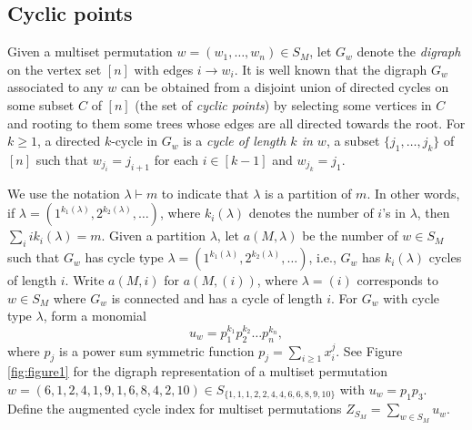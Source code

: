 \documentclass[letterpaper]{amsart}
\theoremstyle{plain}
\theoremstyle{definition}
\theoremstyle{remark}
\begin{document}
\subsection{Cyclic points}
Given a multiset permutation $w= (w_1, \dots, w_n) \in S_M$, let $G_w$ denote the {\em digraph} on the vertex set $[n]$ with edges $i \rightarrow w_i$. It is well known that the digraph $G_w$ associated to any $w$ can be obtained from a disjoint union of directed cycles on some subset $C$ of $[n]$ (the set of {\em cyclic points}) by selecting some vertices in $C$ and rooting to them some trees whose edges are all directed towards the root. 
For $k\geq 1$, a directed $k$-cycle in $G_w$ is a {\em cycle of length $k$ in $w$}, a subset $\{j_1, \ldots, j_k\}$ of $[n]$ such that $w_{j_i} = j_{i + 1}$ for each $i \in [k - 1]$ and $w_{j_k} = j_1$.

We use the notation $\lambda \vdash m$ to indicate that $\lambda$ is a partition of $m$. In other words, if $\lambda=(1^{k_1(\lambda)}, 2^{k_2(\lambda)}, \dots)$, where $k_i(\lambda)$ denotes the number of $i$'s in $\lambda$, then $\sum_i ik_i(\lambda) = m$. Given a partition $\lambda$, let $a(M,\lambda)$ be the number of $w\in S_M$ such that $G_w$ has cycle type 
$\lambda=(1^{k_1(\lambda)}, 2^{k_2(\lambda)}, \dots)$, i.e., $G_w$ has $k_i(\lambda)$ cycles of length $i$. Write $a(M,i)$ for $a(M,(i))$, where $\lambda=(i)$ corresponds to $w \in S_M$ where $G_w$ is connected and has a cycle of length $i$. For $G_w$ with cycle type $\lambda$, form a monomial
\[u_w=p_1^{k_1} p_2^{k_2} \dots p_n^{k_n},\]
where $p_j$ is a power sum symmetric function $p_j=\sum_{i \geq 1} x_i^j$. See Figure \ref{fig:figure1} for the digraph representation of a multiset permutation $w=(6, 1, 2, 4, 1, 9, 1, 6, 8, 4, 2, 10) \in S_{\{1, 1, 1, 2, 2, 4, 4, 6, 6, 8, 9, 10\}}$ with $u_w=p_1p_3$. Define the augmented cycle index for multiset permutations
$Z_{S_M}=\sum_{w \in S_M} u_w$.
\end{document}
